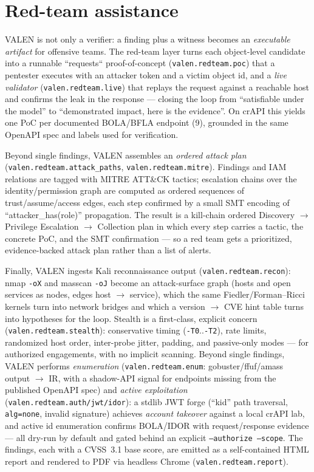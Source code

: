 \documentclass[11pt]{article}
\begin{document}
\section{Red-team assistance}
VALEN is not only a verifier: a finding plus a witness becomes an
\emph{executable artifact} for offensive teams. The red-team layer turns each
object-level candidate into a runnable ``requests`` proof-of-concept
(\texttt{valen.redteam.poc}) that a pentester executes with an attacker token and
a victim object id, and a \emph{live validator} (\texttt{valen.redteam.live})
that replays the request against a reachable host and confirms the leak in the
response --- closing the loop from ``satisfiable under the model'' to
``demonstrated impact, here is the evidence''. On crAPI this yields one PoC per
documented BOLA/BFLA endpoint (9), grounded in the same OpenAPI spec and labels
used for verification.

Beyond single findings, VALEN assembles an \emph{ordered attack plan}
(\texttt{valen.redteam.attack\_paths}, \texttt{valen.redteam.mitre}). Findings
and IAM relations are tagged with MITRE ATT\&CK tactics; escalation chains over
the identity/permission graph are computed as ordered sequences of
trust/assume/access edges, each step confirmed by a small SMT encoding of
``attacker\_has(role)'' propagation. The result is a kill-chain ordered
Discovery $\to$ Privilege Escalation $\to$ Collection plan in which every step
carries a tactic, the concrete PoC, and the SMT confirmation --- so a red team
gets a prioritized, evidence-backed attack plan rather than a list of alerts.

Finally, VALEN ingests Kali reconnaissance output (\texttt{valen.redteam.recon}):
nmap \texttt{-oX} and masscan \texttt{-oJ} become an attack-surface graph (hosts
and open services as nodes, edges host $\to$ service), which the same
Fiedler/Forman--Ricci kernels turn into network bridges and which a version
$\to$ CVE hint table turns into hypotheses for the loop. Stealth is a first-class,
explicit concern (\texttt{valen.redteam.stealth}): conservative timing
(\texttt{-T0}..\texttt{-T2}), rate limits, randomized host order, inter-probe
jitter, padding, and passive-only modes --- for authorized engagements, with no
implicit scanning. Beyond single findings, VALEN performs \emph{enumeration}
(\texttt{valen.redteam.enum}: gobuster/ffuf/amass output $\to$ IR, with a
shadow-API signal for endpoints missing from the published OpenAPI spec) and
\emph{active exploitation} (\texttt{valen.redteam.auth/jwt/idor}): a stdlib JWT
forge (``kid'' path traversal, \texttt{alg=none}, invalid signature) achieves
\emph{account takeover} against a local crAPI lab, and active id enumeration
confirms BOLA/IDOR with request/response evidence --- all dry-run by default and
gated behind an explicit \texttt{--authorize --scope}. The findings, each with a
CVSS~3.1 base score, are emitted as a self-contained HTML report and rendered to
PDF via headless Chrome (\texttt{valen.redteam.report}).
\end{document}
